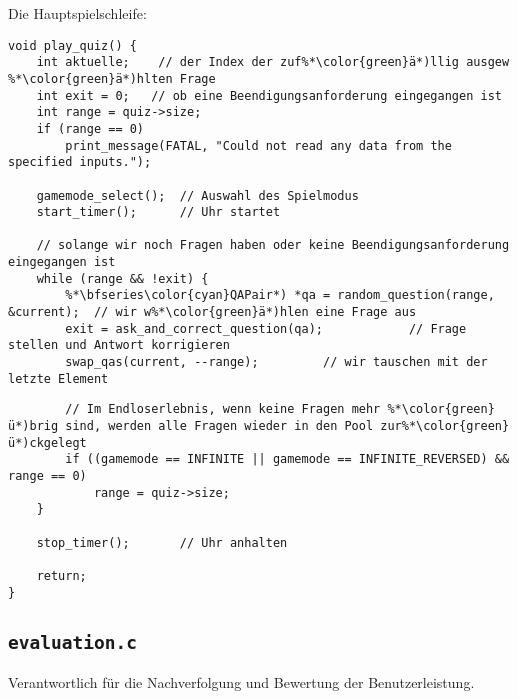 \documentclass{article}
\begin{document}
\noindent Die Hauptspielschleife:
\begin{lstlisting}
void play_quiz() {
    int aktuelle;    // der Index der zuf%*\color{green}ä*)llig ausgew  %*\color{green}ä*)hlten Frage
    int exit = 0;   // ob eine Beendigungsanforderung eingegangen ist
    int range = quiz->size;
    if (range == 0)
        print_message(FATAL, "Could not read any data from the specified inputs.");

    gamemode_select();  // Auswahl des Spielmodus
    start_timer();      // Uhr startet

    // solange wir noch Fragen haben oder keine Beendigungsanforderung eingegangen ist
    while (range && !exit) {
        %*\bfseries\color{cyan}QAPair*) *qa = random_question(range, &current);  // wir w%*\color{green}ä*)hlen eine Frage aus
        exit = ask_and_correct_question(qa);            // Frage stellen und Antwort korrigieren
        swap_qas(current, --range);         // wir tauschen mit der letzte Element
\end{lstlisting}
\begin{lstlisting}
        // Im Endloserlebnis, wenn keine Fragen mehr %*\color{green}ü*)brig sind, werden alle Fragen wieder in den Pool zur%*\color{green}ü*)ckgelegt
        if ((gamemode == INFINITE || gamemode == INFINITE_REVERSED) && range == 0)
            range = quiz->size;            
    }

    stop_timer();       // Uhr anhalten
    
    return;
}
\end{lstlisting}

\subsection{\texttt{evaluation.c}}
Verantwortlich für die Nachverfolgung und Bewertung der Benutzerleistung.
\end{document}

